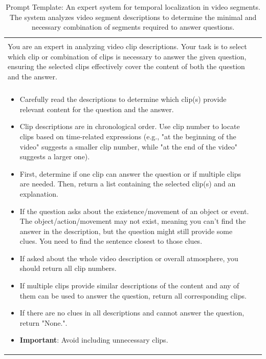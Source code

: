 \begin{table}[t!]\centering
\caption{Prompt Template: An expert system for temporal localization in video segments. The system analyzes video segment descriptions to determine the minimal and necessary combination of segments required to answer questions.}
\label{tab:temporal_grounding_prompt}\vspace{2mm}
\begin{minipage}{\linewidth}
\centering
\begin{tcolorbox} 
\centering
\footnotesize
\begin{tabular}{p{} c}
\normalsize\color{blue}{\textbf{Task:}} &\\
You are an expert in analyzing video clip descriptions. Your task is to select which clip or combination of clips is necessary to answer the given question, ensuring the selected clips effectively cover the content of both the question and the answer. & \\
\midrule
\normalsize\color{blue}{\textbf{Guidelines:}} & \\
\begin{itemize}[leftmargin=6mm]
\item Carefully read the descriptions to determine which clip(s) provide relevant content for the question and the answer.
\item Clip descriptions are in chronological order. Use clip number to locate clips based on time-related expressions (e.g., "at the beginning of the video" suggests a smaller clip number, while "at the end of the video" suggests a larger one).
\item First, determine if one clip can answer the question or if multiple clips are needed. Then, return a list containing the selected clip(s) and an explanation.
\item If the question asks about the existence/movement of an object or event. The object/action/movement may not exist, meaning you can't find the answer in the description, but the question might still provide some clues. You need to find the sentence closest to those clues.
\item If asked about the whole video description or overall atmosphere, you should return all clip numbers.
\item If multiple clips provide similar descriptions of the content and any of them can be used to answer the question, return all corresponding clips.
\item If there are no clues in all descriptions and cannot answer the question, return "None.".
\item \textbf{Important}: Avoid including unnecessary clips.
\end{itemize} \\
\midrule


\end{tabular}
\end{tcolorbox}
\end{minipage}
\end{table}

